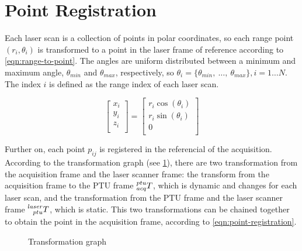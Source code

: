 \section{Point Registration}
\label{section:point-registration}

Each laser scan is a collection of points in polar coordinates, so each range point $(r_i, \theta_i)$ is transformed to a point in the laser frame of reference according to \cref{eqn:range-to-point}. The angles are uniform distributed between a minimum and maximum angle, $\theta_{min}$ and $\theta_{max}$, respectively, so $\theta_i = \{\theta_{min}, \ \dots, \ \theta_{max}\}, i=1 \dots N$. The index $i$ is defined as the range index of each laser scan.

\begin{equation}\label{eqn:range-to-point}
    \left[
        \begin{array}{c}
            x_i \\
            y_i \\
            z_i \\
        \end{array}
    \right]
    =
    \left[
        \begin{array}{c}
            r_i \cos(\theta_i) \\
            r_i \sin(\theta_i) \\
            0 \\
        \end{array}    
    \right]
\end{equation}

Further on, each point $p_{ij}$ is registered in the referencial of the acquisition. According to the transformation graph (see \cref{figure:geometric-transformation-graph}), there are two transformation from the acquisition frame and the laser scanner frame: the transform from the acquisition frame to the PTU frame $\TF{acq}{ptu}$, which is dynamic and changes for each laser scan, and the transformation from the PTU frame and the laser scanner frame $\TF{ptu}{laser}$, which is static. This two transformations can be chained together to obtain the point in the acquisition frame, according to \cref{eqn:point-registration}.


\begin{figure}
    
    \centering
    
    \caption{Transformation graph}
    \label{figure:geometric-transformation-graph}
\end{figure}

